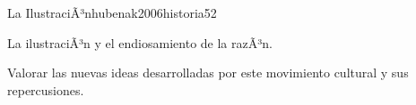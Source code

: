 \begin{syllabus}
\begin{unit}{La IlustraciÃ³n}{hubenak2006historia}{5}{2}
\begin{topics}
	\item La ilustraciÃ³n y el endiosamiento de la razÃ³n.
\end{topics}
\begin{unitgoals}
	\item Valorar las nuevas ideas desarrolladas por este movimiento cultural y sus repercusiones.
\end{unitgoals}
\end{unit}



\begin{coursebibliography}
\end{coursebibliography}

\end{syllabus}
